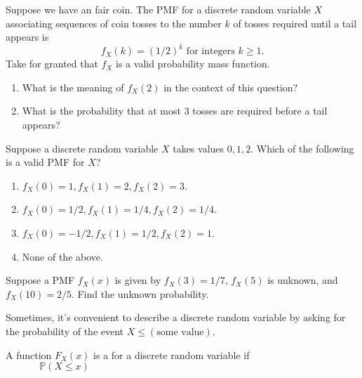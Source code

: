 \documentclass[../main.tex]{subfiles}
\begin{document}
\begin{example}
  Suppose we have an fair coin. The PMF for a discrete random variable \(X\) associating sequences of coin tosses to the number \(k\) of tosses required until a tail appears is
  \[
    f_{X}(k) = (1/2)^{k} \text{ for integers } k \ge 1.
  \]
  Take for granted that \(f_{X}\) is a valid probability mass function. 

  \begin{enumerate}[wide]
    \item What is the meaning of \(f_{X}(2)\) in the context of this question?
    \item What is the probability that at most \(3\) tosses are required before a tail appears?
  \end{enumerate}
\end{example}

\begin{example}
  Suppose a discrete random variable \(X\) takes values \(0,1,2\). Which of the following is a valid PMF for \(X\)?

  \begin{enumerate}[label=(\alph*)]
    \item \(f_{X}(0) = 1, f_{X}(1) = 2, f_{X}(2) = 3\).
    \item \(f_{X}(0) = 1/2, f_{X}(1) = 1/4, f_{X}(2) = 1/4\).
    \item \(f_{X}(0) = -1/2, f_{X}(1) = 1/2, f_{X}(2) = 1\).
    \item None of the above.
  \end{enumerate}
\end{example}

\begin{example}
  Suppose a PMF \(f_{X}(x)\) is given by \(f_{X}(3) = 1/7\), \(f_{X}(5)\) is unknown, and \(f_{X}(10) = 2/5\).  Find the unknown probability.
\end{example}

\clearpage

Sometimes, it's convenient to describe a discrete random variable by asking for the probability of the event \(X \le (\text{some value})\). 

\begin{definition} \label{def:discrete-cdf}
  A function \(F_{X}(x)\) is a  for a discrete random variable if 
  \[
    \mathbb{P}(X \le x) \hspace{4in} %
  \]
\end{definition}
\end{document}

